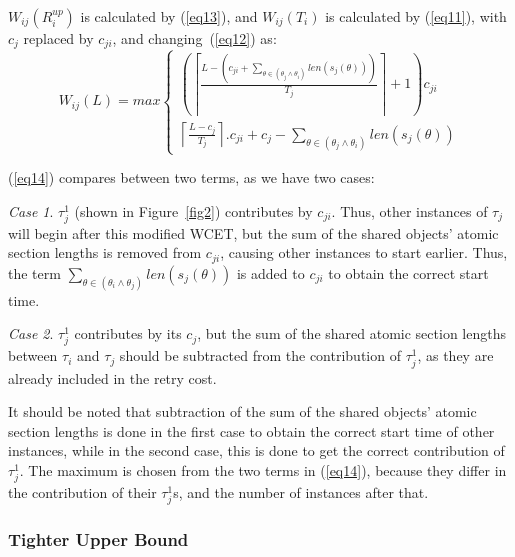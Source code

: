 \documentclass{sig-alternate}
\begin{document}
$W_{ij}(R_{i}^{up})$ is calculated by (\ref{eq13}), and $W_{ij}(T_{i})$
is calculated by (\ref{eq11}), with $c_{j}$ replaced by 
$c_{ji}$, and changing~(\ref{eq12}) as:
\begin{equation}
W_{ij}(L)=max\begin{cases}
\left(\left\lceil\frac{L-\left(c_{ji}+\sum_{\theta\in(\theta_{j}\wedge\theta_{i})}len(s_{j}(\theta))\right)}{T_{j}}\right\rceil+1 \right)c_{ji}\\
\left\lceil\frac{L-c_{j}}{T_{j}}\right\rceil.c_{ji}+c_{j}-\sum_{\theta\in(\theta_{j}\wedge\theta_{i})}len(s_{j}(\theta))\end{cases}\label{eq14}\end{equation}

(\ref{eq14}) compares between two terms, as we have two cases:


\textit{Case 1}. $\tau_j^1$ (shown in Figure~\ref{fig2}) contributes by $c_{ji}$. Thus, other instances of $\tau_j$ will begin after this modified WCET, but the sum of the shared objects' atomic section lengths is removed from $c_{ji}$, causing other instances to start earlier. Thus, the term $\sum_{\theta\in(\theta_i\wedge\theta_j)} {len(s_{j}(\theta))}$ is added to $c_{ji}$ to obtain the correct start time. 

\textit{Case 2}. $\tau_j^1$ contributes by its $c_j$, but the sum of the shared atomic section lengths  between $\tau_i$ and $\tau_j$ should be subtracted from the contribution of $\tau_j^1$, as they are already included in the retry cost. 

It should be noted that subtraction of the sum of the shared objects' atomic section lengths is done in the first case to obtain the correct start time of other instances, while in the second case, this is done to get the correct contribution of $\tau_j^1$. The maximum is chosen from the two terms in (\ref{eq14}), because they differ in the contribution of their $\tau_j^1$s, and the number of instances after that.

\subsubsection{Tighter Upper Bound}
\end{document}
